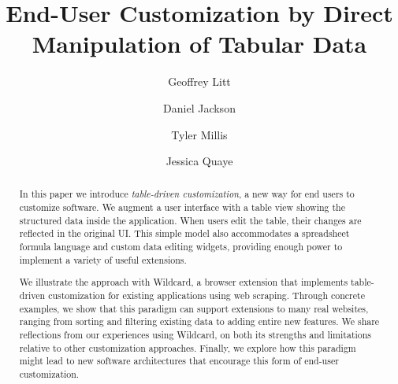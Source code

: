 \documentclass[sigplan,screen,10pt,anonymous,review]{acmart}
\begin{document}
\title{End-User Customization by Direct Manipulation of Tabular Data}


\author{Geoffrey Litt}

\author{Daniel Jackson}

\author{Tyler Millis}

\author{Jessica Quaye}


\begin{abstract}
  In this paper we introduce \emph{table-driven customization}, a new
  way for end users to customize software. We augment a user interface
  with a table view showing the structured data inside the application.
  When users edit the table, their changes are reflected in the original
  UI. This simple model also accommodates a spreadsheet formula language
  and custom data editing widgets, providing enough power to implement a
  variety of useful extensions.

  We illustrate the approach with Wildcard, a browser extension that
  implements table-driven customization for existing applications using
  web scraping. Through concrete examples, we show that this paradigm
  can support extensions to many real websites, ranging from sorting and
  filtering existing data to adding entire new features. We share
  reflections from our experiences using Wildcard, on both its strengths
  and limitations relative to other customization approaches. Finally,
  we explore how this paradigm might lead to new software architectures
  that encourage this form of end-user customization.
\end{abstract}
\end{document}
